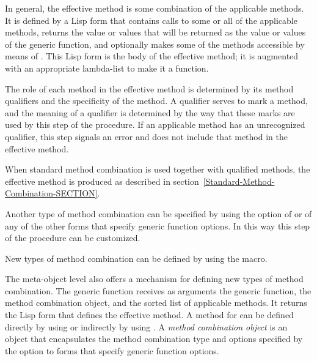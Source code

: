 In general, the effective method is some combination of the applicable
methods.  It is defined by a Lisp form that contains calls to some or all
of the applicable methods, returns the value or values that will be
returned as the value or values of the generic function, and optionally
makes some of the methods accessible by means of .
This Lisp form is the body of the effective method; it is augmented with
an appropriate lambda-list to make it a function.

The role of each method in the effective method is determined by its
method qualifiers and the specificity of the method.  A qualifier
serves to mark a method, and the meaning of a qualifier is
determined by the way that these marks are used by this step
of the procedure.  If an applicable method has an unrecognized
qualifier, this step signals an error and does not include that method
in the effective method.

When standard method combination is used together with qualified methods, 
the effective method is produced as described in
section~\ref{Standard-Method-Combination-SECTION}.

Another type of method combination can be specified by using the 
 option of  or of any of the other
forms that specify generic function options.  In this way this step of
the procedure can be customized.

New types of method combination can be defined by using the 
 macro. 


The meta-object level also offers a mechanism for defining new types
of method combination.  The generic function 
 receives as arguments the generic function,
the method combination object, and the sorted list of applicable
methods.  It returns the Lisp form that defines the effective method.
A method for  can be defined directly by
using  or indirectly by using 
.
A \emph{method combination object} is an
object that encapsulates the method combination type and options
specified by the  option to forms that
specify generic function options.



